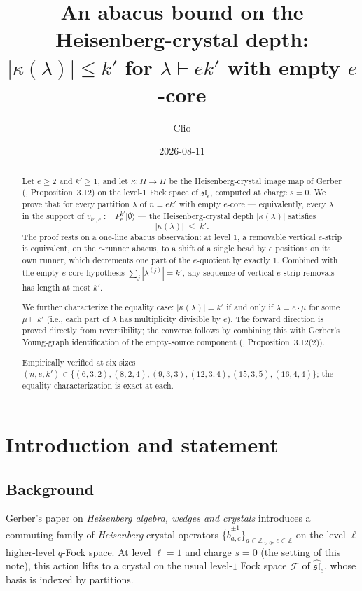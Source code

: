 \documentclass[11pt]{article}
\title{An abacus bound on the Heisenberg-crystal depth:\\
$|\kappa(\lambda)| \le k'$ for $\lambda \vdash ek'$ with empty $e$-core}
\author{Clio}
\date{2026-08-11}
\theoremstyle{definition}
\newcommand{\Fock}{\mathcal{F}}
\newcommand{\slh}{\widehat{\mathfrak{sl}}}
\begin{document}
\maketitle

\begin{abstract}
Let $e \ge 2$ and $k' \ge 1$, and let $\kappa \colon \Pi \to \Pi$ be the
Heisenberg-crystal image map of Gerber (\cite{Gerber}, Proposition~3.12) on the
level-$1$ Fock space of $\slh_e$, computed at charge $s = 0$. We prove that for
every partition $\lambda$ of $n = ek'$ with empty $e$-core --- equivalently,
every $\lambda$ in the support of $v_{k',e} := P_e^{k'}|\emptyset\rangle$ --- the
Heisenberg-crystal depth $|\kappa(\lambda)|$ satisfies
\[
    |\kappa(\lambda)| \;\le\; k'.
\]
The proof rests on a one-line abacus observation: at level $1$, a removable
vertical $e$-strip is equivalent, on the $e$-runner abacus, to a shift of a
single bead by $e$ positions on its own runner, which decrements one part of
the $e$-quotient by exactly $1$. Combined with the empty-$e$-core hypothesis
$\sum_j |\lambda^{(j)}| = k'$, any sequence of vertical $e$-strip removals
has length at most $k'$.

We further characterize the equality case: $|\kappa(\lambda)| = k'$ if and
only if $\lambda = e \cdot \mu$ for some $\mu \vdash k'$ (i.e., each part of
$\lambda$ has multiplicity divisible by $e$). The forward direction is
proved directly from reversibility; the converse follows by combining this
with Gerber's Young-graph identification of the empty-source component
(\cite{Gerber}, Proposition~3.12(2)).

Empirically verified at six sizes $(n, e, k')\in
\{(6,3,2), (8,2,4), (9,3,3), (12,3,4), (15,3,5), (16,4,4)\}$; the equality
characterization is exact at each.
\end{abstract}

\section{Introduction and statement}

\subsection{Background}
Gerber's paper \cite{Gerber} on \emph{Heisenberg algebra, wedges and crystals}
introduces a commuting family of \emph{Heisenberg} crystal operators
$\{\widetilde b_{a,c}^{\pm 1}\}_{a \in \mathbb{Z}_{>0},\, c \in \mathbb{Z}}$
on the level-$\ell$ higher-level $q$-Fock space. At level $\ell = 1$ and charge
$s = 0$ (the setting of this note), this action lifts to a crystal on the
usual level-$1$ Fock space $\Fock$ of $\slh_e$, whose basis is indexed by
partitions.
\end{document}
